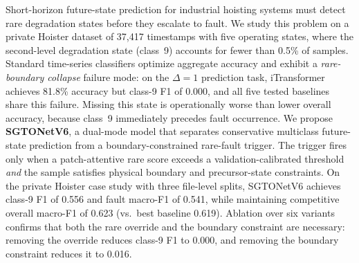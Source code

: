 Short-horizon future-state prediction for industrial hoisting systems must detect rare degradation states before they escalate to fault.
We study this problem on a private Hoister dataset of 37,417 timestamps with five operating states, where the second-level degradation state (class~9) accounts for fewer than 0.5\% of samples.
Standard time-series classifiers optimize aggregate accuracy and exhibit a \emph{rare-boundary collapse} failure mode: on the $\Delta{=}1$ prediction task, iTransformer achieves 81.8\% accuracy but class-9 F1 of 0.000, and all five tested baselines share this failure.
Missing this state is operationally worse than lower overall accuracy, because class~9 immediately precedes fault occurrence.
We propose \textbf{SGTONetV6}, a dual-mode model that separates conservative multiclass future-state prediction from a boundary-constrained rare-fault trigger.
The trigger fires only when a patch-attentive rare score exceeds a validation-calibrated threshold \emph{and} the sample satisfies physical boundary and precursor-state constraints.
On the private Hoister case study with three file-level splits, SGTONetV6 achieves class-9 F1 of 0.556 and fault macro-F1 of 0.541, while maintaining competitive overall macro-F1 of 0.623 (vs.\ best baseline 0.619).
Ablation over six variants confirms that both the rare override and the boundary constraint are necessary: removing the override reduces class-9 F1 to 0.000, and removing the boundary constraint reduces it to 0.016.

